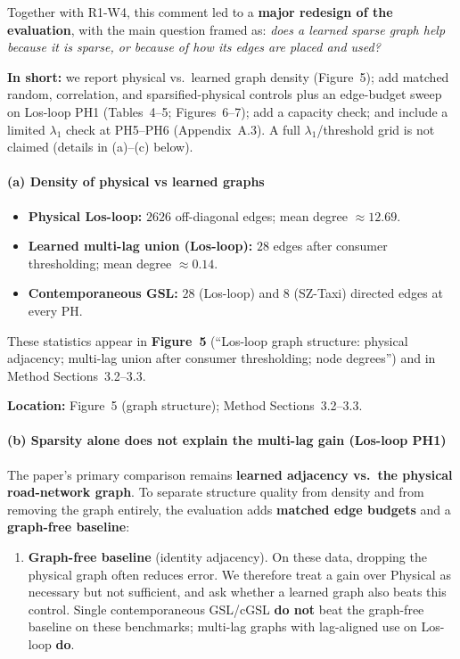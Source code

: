 \documentclass[a4paper,11pt]{article}
\newcommand{\response}[1]{%
    \begin{myresponse}
        #1
    \end{myresponse}
    \vspace{5mm}
}
\begin{document}
\response{
Together with R1-W4, this comment led to a \textbf{major redesign of the evaluation}, with the main question framed as: \emph{does a learned sparse graph help because it is sparse, or because of how its edges are placed and used?}

\textbf{In short:} we report physical vs.\ learned graph density (Figure~5); add matched random, correlation, and sparsified-physical controls plus an edge-budget sweep on Los-loop PH1 (Tables~4--5; Figures~6--7); add a capacity check; and include a limited $\lambda_1$ check at PH5--PH6 (Appendix~A.3). A full $\lambda_1$/threshold grid is not claimed (details in (a)--(c) below).

\paragraph{(a) Density of physical vs learned graphs}
\begin{itemize}
    \item \textbf{Physical Los-loop:} $2626$ off-diagonal edges; mean degree $\approx 12.69$.
    \item \textbf{Learned multi-lag union (Los-loop):} $28$ edges after consumer thresholding; mean degree $\approx 0.14$.
    \item \textbf{Contemporaneous GSL:} $28$ (Los-loop) and $8$ (SZ-Taxi) directed edges at every PH.
\end{itemize}
These statistics appear in \textbf{Figure~5} (``Los-loop graph structure: physical adjacency; multi-lag union after consumer thresholding; node degrees'') and in Method Sections~3.2--3.3.

\textbf{Location:} Figure~5 (graph structure); Method Sections~3.2--3.3.

\paragraph{(b) Sparsity alone does not explain the multi-lag gain (Los-loop PH1)}
The paper's primary comparison remains \textbf{learned adjacency vs.\ the physical road-network graph}. To separate structure quality from density and from removing the graph entirely, the evaluation adds \textbf{matched edge budgets} and a \textbf{graph-free baseline}:

\begin{enumerate}
    \item \textbf{Graph-free baseline} (identity adjacency).
    On these data, dropping the physical graph often reduces error. We therefore treat a gain over Physical as necessary but not sufficient, and ask whether a learned graph also beats this control. Single contemporaneous GSL/cGSL \textbf{do not} beat the graph-free baseline on these benchmarks; multi-lag graphs with lag-aligned use on Los-loop \textbf{do}.


\end{enumerate}}
\end{document}
